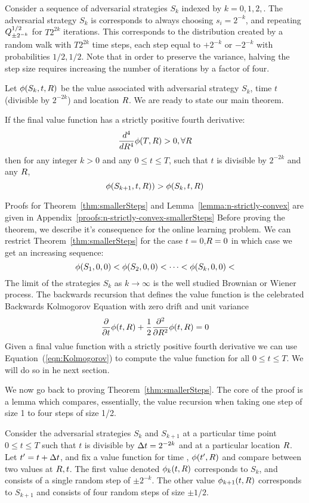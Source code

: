 \documentclass[12pt]{article} %
\begin{document}
Consider a sequence of adversarial strategies $S_k$ indexed by
$k=0,1,2,$. The adversarial strategy $S_k$ is corresponds to always
choosing $s_i = 2^{-k}$, and repeating  $Q^{1/2}_{\pm 2^{-k}}$ 
for $T 2^{2k}$ iterations.
This corresponds to the distribution created by a random walk with
$T 2^{2k}$ time steps, each step equal to $+2^{-k}$ or  $-2^{-k}$ with probabilities $1/2,1/2$.
Note that in order to preserve the variance, halving the step size
requires increasing the number of iterations by a factor of four.

Let $\phi(S_k,t,R)$ be the value associated with adversarial
strategy $S_k$, time $t$ (divisible by $2^{-2k}$) and
location $R$. We are ready to state our main theorem.

\begin{theorem}\label{thm:smallerSteps}
  If the final value function has a strictly positive fourth
  derivative:
  $$ \frac{d^4}{d R^4} \phi(T,R) >0, \forall R$$
  then for any integer $k>0$ and any $0 \leq  t \leq T$, such that $t$
  is divisible by
  $2^{-2k}$ and any $R$,
  $$\phi(S_{k+1},t,R)) >  \phi(S_{k},t,R)$$
\end{theorem}
Proofs for Theorem~\ref{thm:smallerSteps} and
Lemma~\ref{lemma:n-strictly-convex} are given in Appendix~\ref{proofs:n-strictly-convex-smallerSteps}
Before proving the theorem, we describe it's
consequence for the online learning problem.
We can restrict Theorem~\ref{thm:smallerSteps} for the
case $t=0$,$R=0$ in which case we get an increasing sequence:
\[
\phi(S_1,0,0) < \phi(S_2,0,0) <\cdots <\phi(S_k,0,0) <
\]
The limit of the strategies $S_k$ as $k \to \infty$ is the well
studied Brownian or Wiener process. The backwards recursion that
defines the value function is the celebrated Backwards Kolmogorov
Equation with zero drift and unit variance
\begin{equation} \label{eqn:Kolmogorov}
  \frac{\partial}{\partial t} \phi(t,R)
  + \frac{1}{2} \frac{\partial^2}{\partial R^2} \phi(t,R)=0
\end{equation}
Given a final value function with a strictly positive fourth
derivative we can use Equation~(\ref{eqn:Kolmogorov}) to compute the
value function for all $0 \leq t \leq T$. We will do so in he next section.

We now go back to proving Theorem~\ref{thm:smallerSteps}. The core of
the proof is a lemma which compares, essentially, the value recursion
when taking one step of size 1 to four steps of size 1/2.


Consider the adversarial strategies $S_k$ and $S_{k+1}$ at a particular
time point $0 \leq t \leq T$ such that $t$ is divisible by
$\Delta t=2^{-2k}$ and at a particular location $R$. Let
$t'=t+\Delta t$, and fix a value
function for time , $\phi(t',R)$ and compare between
two values at $R,t$. The first value denoted
$\phi_k(t,R)$ corresponds to $S_k$, and consists of a single random step of $\pm 2^{-k}$. 
The other value $\phi_{k+1}(t,R)$ corresponds to $S_{k+1}$ and consists of
four random steps of size $\pm 1/2$.
\end{document}
